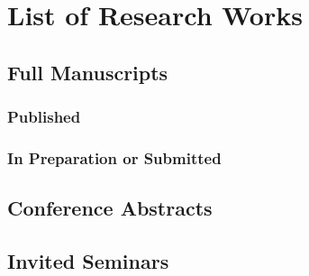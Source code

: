 \section{List of Research Works}

\subsection{Full Manuscripts}

\subsubsection{Published}

\subsubsection{In Preparation or Submitted}

\subsection{Conference Abstracts}

\subsection{Invited Seminars}

